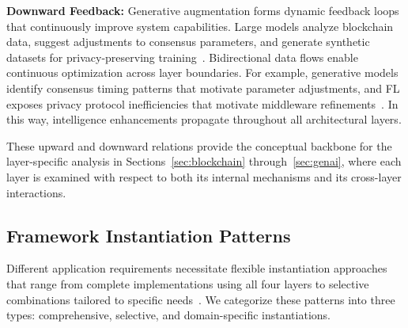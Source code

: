 \documentclass[5p,twocolumn]{elsarticle}
\begin{document}
\textbf{Downward Feedback:} Generative augmentation forms dynamic feedback loops that continuously improve system capabilities. Large models analyze blockchain data, suggest adjustments to consensus parameters, and generate synthetic datasets for privacy-preserving training~\cite{brown2020language,zhao2023survey,bengesi2024advancements}. Bidirectional data flows enable continuous optimization across layer boundaries. For example, generative models identify consensus timing patterns that motivate parameter adjustments, and FL exposes privacy protocol inefficiencies that motivate middleware refinements~\cite{yuan2022roadmap}. In this way, intelligence enhancements propagate throughout all architectural layers.

These upward and downward relations provide the conceptual backbone for the layer-specific analysis in Sections~\ref{sec:blockchain} through~\ref{sec:genai}, where each layer is examined with respect to both its internal mechanisms and its cross-layer interactions.

\subsection{Framework Instantiation Patterns}
Different application requirements necessitate flexible instantiation approaches that range from complete implementations using all four layers to selective combinations tailored to specific needs~\cite{liu2023web3}. We categorize these patterns into three types: comprehensive, selective, and domain-specific instantiations.
\end{document}
